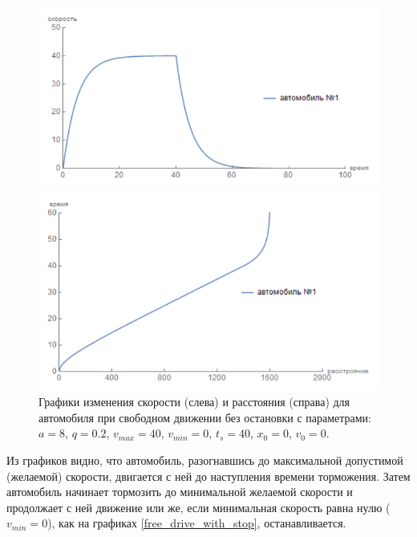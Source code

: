 \documentclass[12pt, a4paper]{extarticle}
\numberwithin{equation}{section}
\begin{document}
\begin{figure}[h!]
	\begin{center}
		\begin{minipage}[h!]{0.48\linewidth}
			\includegraphics[width=1\linewidth,height=0.2\textheight]
			{Images/free_drive_speed_with_stop.png}
		\end{minipage}
		\hfill 
		\begin{minipage}[h!]{0.48\linewidth}
			\includegraphics[width=1\linewidth,height=0.2\textheight]
			{Images/free_drive_distance_with_stop.png}
		\end{minipage}
		\caption{Графики изменения скорости (слева) и расстояния (справа) для автомобиля при свободном движении без остановки с параметрами: $a=8$, $q=0.2$, $v_{max}=40$, $v_{min}=0$, $t_s=40$, $x_0=0$, $v_0=0$.}
		\label{free_drive_with_stop}
	\end{center}
\end{figure}

Из графиков видно, что автомобиль, разогнавшись до максимальной допустимой (желаемой) скорости, двигается с ней до наступления времени торможения. Затем автомобиль начинает тормозить до минимальной желаемой скорости и продолжает с ней движение или же, если минимальная скорость равна нулю ($v_{min}=0$), как на графиках \eqref{free_drive_with_stop}, останавливается.
 
\end{document}
